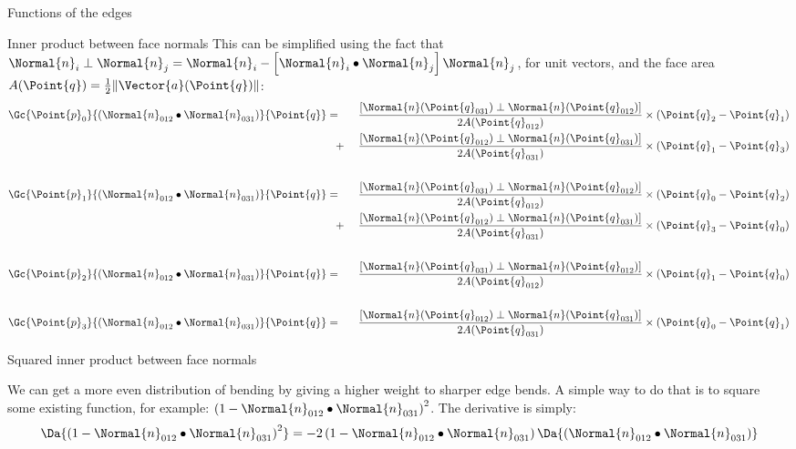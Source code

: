 \begin{plSection}{Functions of the edges}
\begin{plSection}{Inner product between face normals}
This can be simplified using the fact that
\(\Normal{n}_i \perp \Normal{n}_j = \Normal{n}_i - \left[ \Normal{n}_i \bullet \Normal{n}_j \right] \Normal{n}_j\), for unit vectors,
and the face area \(A(\Point{q}) = \frac{1}{2} \| \Vector{a}(\Point{q}) \|\):
\begin{eqnarray}
\label{eq:simplified_normal_dot_gradient}
\Gc{\Point{p}_0}{(\Normal{n}_{012} \bullet \Normal{n}_{031})}{\Point{q}}
& = \;\;\; &
\frac{\left[ \Normal{n}(\Point{q}_{031}) \perp \Normal{n}(\Point{q}_{012}) \right]}{2A(\Point{q}_{012})}
\times (\Point{q}_2 - \Point{q}_1)
\\
& \;\;\; + &
\frac{\left[ \Normal{n}(\Point{q}_{012}) \perp \Normal{n}(\Point{q}_{031}) \right]}{2A(\Point{q}_{031})}
\times (\Point{q}_1 - \Point{q}_3)
\nonumber \\
& & \nonumber \\
\Gc{\Point{p}_1}{(\Normal{n}_{012} \bullet \Normal{n}_{031})}{\Point{q}}
& = \;\;\; &
\frac{\left[ \Normal{n}(\Point{q}_{031}) \perp \Normal{n}(\Point{q}_{012}) \right]}{2A(\Point{q}_{012})}
\times (\Point{q}_0 - \Point{q}_2)
\nonumber \\
& \;\;\; + &
\frac{\left[ \Normal{n}(\Point{q}_{012}) \perp \Normal{n}(\Point{q}_{031}) \right]}{2A(\Point{q}_{031})}
\times (\Point{q}_3 - \Point{q}_0)
\nonumber \\
& & \nonumber \\
\Gc{\Point{p}_2}{(\Normal{n}_{012} \bullet \Normal{n}_{031})}{\Point{q}}
& = \;\;\; &
\frac{\left[ \Normal{n}(\Point{q}_{031}) \perp \Normal{n}(\Point{q}_{012}) \right]}{2A(\Point{q}_{012})}
\times (\Point{q}_1 - \Point{q}_0)
\nonumber \\
& & \nonumber \\
\Gc{\Point{p}_3}{(\Normal{n}_{012} \bullet \Normal{n}_{031})}{\Point{q}}
& = \;\;\; &
\frac{\left[ \Normal{n}(\Point{q}_{012}) \perp \Normal{n}(\Point{q}_{031}) \right]}{2A(\Point{q}_{031})}
\times (\Point{q}_0 - \Point{q}_1)
\nonumber
\end{eqnarray}

\end{plSection}%
\begin{plSection}{Squared inner product between face normals}
\label{sec:squared_normal_dot}

We can get a more even distribution of bending by giving
a higher weight to sharper edge bends.
A simple way to do that is to square some existing function,
for example: $\left(1 - \Normal{n}_{012} \bullet \Normal{n}_{031}\right)^2$.
The derivative is simply:
\begin{equation}
\Da{\left(1 - \Normal{n}_{012} \bullet \Normal{n}_{031}\right)^2}
= -2 \left( 1 - \Normal{n}_{012} \bullet \Normal{n}_{031} \right)
\Da{(\Normal{n}_{012} \bullet \Normal{n}_{031})}
\end{equation}


\end{plSection}
\end{plSection}
